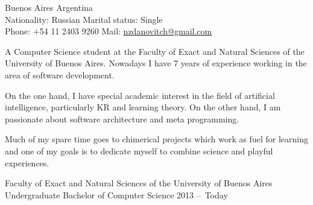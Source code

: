 \documentclass[10pt,a4paper]{article}
\begin{document}
\sloppy



\nobreakvspace{0.3em}

\noindent
Buenos Aires \sbull
Argentina \\
Nationality: Russian \sbull
Marital status: Single \\
Phone: +54 11 2403 9260 \sbull
Mail: \href{mailto:nzdanovitch.at.gmail.dot.com}{nzdanovitch\mbox{}@\mbox{}gmail.com}


\spacedhrule{1.2em}{-0.4em}  %





\vspace{-1.3em}
\begin{multicols}{2}
\noindent

A Computer Science student at the Faculty of Exact and Natural Sciences of
the University of Buenos Aires. Nowadays I have 7 years of experience working
in the area of software development.

On the one hand, I have special academic interest in the field of artificial
intelligence, particularly KR and learning theory. On the other hand, I am
passionate about software architecture and meta programming.

Much of my spare time goes to chimerical projects which work as fuel for
learning and one of my goals is to dedicate myself to combine science and
playful experiences.


%
%

\end{multicols}


\spacedhrule{0.3em}{-0.4em} %




\vspace{0.2em}
\headedsection
  { Faculty of Exact and Natural Sciences of the University of Buenos Aires }
  { \textsc{} } {%
  \headedsubsection
    { Undergraduate Bachelor of Computer Science }
    { 2013 --\ Today \ }{}
}
\end{document}

